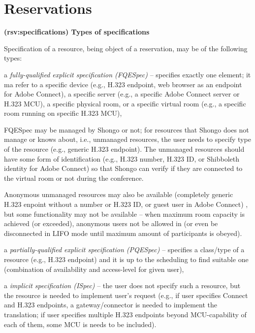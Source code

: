 \documentclass[a4paper]{report}
\makeatletter
\newcounter{UCcounter}
\newenvironment{UseCases}%
	{\begin{list}{\textbf{UC-\arabic{UCcounter}}}{\@nmbrlisttrue\def\@listctr{UCcounter}}}%
	{\end{list}}
\newcommand{\UClabel}[1]{\label{UC:#1}}
\newcommand{\UseCase}[2]{\item\UClabel{#2} \textbf{(#2) #1}\\ \nopagebreak}
\makeatother
\begin{document}
\section{Reservations}

\begin{UseCases}

\UseCase{Types of specifications}{rsv:specifications}

Specification of a resource, being object of a reservation, may be of the
following types:

\begin{compactitem}

\item a \emph{fully-qualified explicit specification (FQESpec)} -- specifies
exactly one element; it ma refer to a specific device (e.g., H.323 endpoint,
web browser as an endpoint for Adobe Connect), a specific server (e.g., a
specific Adobe Connect server or H.323 MCU), a specific physical room, or a
specific virtual room (e.g., a specific room running on specific H.323 MCU),

FQESpec may be managed by Shongo or not; for resources that Shongo does not
manage or knows about, i.e., unmanaged resources, the user needs to specify
type of the resource (e.g., generic H.323 endpoint). The unmanaged resources
should have some form of identification (e.g., H.323 number, H.323 ID, or
Shibboleth identity for Adobe Connect) so that Shongo can verify if they are
connected to the virtual room or not during the conference.

Anonymous unmanaged resources may also be available (completely generic H.323
enpoint without a number or H.323 ID, or guest user in Adobe Connect) , but
some functionality may not be available -- when maximum room capacity is
achieved (or exceeded), anonymous users not be allowed in (or even be
disconnected in LIFO mode until maximum amount of participants is obeyed).


\item a \emph{partially-qualified explicit specification (PQESpec)} --
specifies a class/type of a resource (e.g., H.323 endpoint) and it is up to the
scheduling to find suitable one (combination of availability and access-level
for given user),

\item a \emph{implicit specification (ISpec)} -- the user does not specify such
a resource, but the resource is needed to implement user's request (e.g., if
user specifies Connect and H.323 endpoints, a gateway/connector is needed to
implement the translation; if user specifies multiple H.323 endpoints beyond
MCU-capability of each of them, some MCU is needs to be included).


\end{compactitem}
\end{UseCases}
\end{document}
